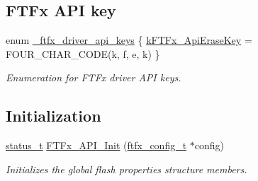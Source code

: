 \subsection*{F\+T\+Fx A\+PI key}
\begin{DoxyCompactItemize}
\item 
enum \mbox{\hyperlink{group__ftfx__controller_gaaed04d931a32adf243a57f5e6d56da2d}{\+\_\+ftfx\+\_\+driver\+\_\+api\+\_\+keys}} \{ \mbox{\hyperlink{group__ftfx__controller_ggaaed04d931a32adf243a57f5e6d56da2da14949b7fee40a9d02fac191828f5f899}{k\+F\+T\+Fx\+\_\+\+Api\+Erase\+Key}} = F\+O\+U\+R\+\_\+\+C\+H\+A\+R\+\_\+\+C\+O\+DE(\textquotesingle{}k\textquotesingle{}, \textquotesingle{}f\textquotesingle{}, \textquotesingle{}e\textquotesingle{}, \textquotesingle{}k\textquotesingle{})
 \}
\begin{DoxyCompactList}\small\item\em Enumeration for F\+T\+Fx driver A\+PI keys. \end{DoxyCompactList}\end{DoxyCompactItemize}
\subsection*{Initialization}
\begin{DoxyCompactItemize}
\item 
\mbox{\hyperlink{group__ksdk__common_gaaabdaf7ee58ca7269bd4bf24efcde092}{status\+\_\+t}} \mbox{\hyperlink{group__ftfx__controller_ga40e6294a537acf6f902b01bdf4cafa27}{F\+T\+Fx\+\_\+\+A\+P\+I\+\_\+\+Init}} (\mbox{\hyperlink{group__ftfx__controller_gab0196063c05bffb4cd2f249699a3378c}{ftfx\+\_\+config\+\_\+t}} $\ast$config)
\begin{DoxyCompactList}\small\item\em Initializes the global flash properties structure members. \end{DoxyCompactList}\end{DoxyCompactItemize}
